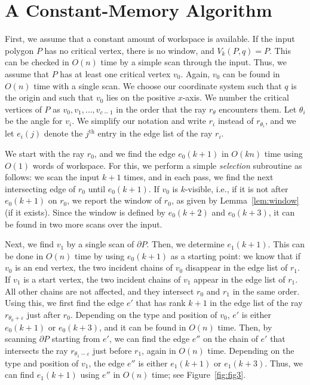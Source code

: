 \documentclass[11pt, a4paper]{article}
\newcommand{\eps}{\varepsilon}
\begin{document}
\section{A Constant-Memory Algorithm}\label{sec:constant-memory algorithm}

First, we assume that a constant amount of workspace is 
available. 
If the input polygon $P$ has no critical vertex, there 
is no window, and $V_k(P,q) = P$. This can be checked
in $O(n)$ time by a simple scan through the input.
Thus, we assume that 
$P$ has at least one critical vertex $v_0$. 
Again, $v_0$ can be found in $O(n)$ time with a single scan.
We choose our coordinate system such that
$q$ is the origin and such that $v_0$ lies on the positive $x$-axis.
We number the critical vertices of $P$ as $v_0, v_1,
\dots, v_{c-1}$ in the order that the ray $r_\theta$
encounters them. Let $\theta_i$ be the angle for $v_i$.
We simplify our notation and write $r_i$ instead
of $r_{\theta_i}$, and we let $e_{i}(j)$ denote the 
$j^\text{th}$ entry in the edge list of the ray $r_{i}$. 

We start with the ray $r_{0}$, and we find 
the edge $e_0(k+1)$ in $O(kn)$ time using $O(1)$ words of workspace. 
For this, we perform a simple \emph{selection} subroutine as follows:
we scan the input $k+1$ times, and in each pass, we find
the next intersecting edge of $r_{0}$ until 
$e_0(k+1)$. If $v_0$ is $k$-visible, i.e., if it is not after  
$e_0(k+1)$ on $r_{0}$, we report the window of 
$r_{0}$, as given by Lemma~\ref{lem:window} (if it exists). 
Since the window is defined by $e_0(k+2)$ and $e_0(k+3)$, 
it can be found in two more scans over the input.

Next, we find $v_1$ by a single scan of $\partial P$.
Then, we determine $e_1(k+1)$. 
This can be done in $O(n)$ time 
by using $e_0(k+1)$ as a starting point: we know that 
if $v_{0}$ is an end
vertex, the two incident chains of $v_0$ disappear
in the edge list of $r_1$. If $v_1$ is a start
vertex, the two incident chains of $v_1$ appear 
in the edge list of $r_1$.
All other chains are not affected, and they intersect $r_0$ and 
$r_1$ in the same order. 
Using this, we first find the edge $e'$ that has
rank $k+1$ in the edge list of the ray $r_{\theta_0 + \eps}$ just after
$r_0$. Depending on the type and position of $v_0$,
$e'$ is either $e_0(k+1)$ or $e_0(k+3)$, and it can
be found in $O(n)$ time. Then,
by scanning $\partial P$ starting from $e'$, we can
find the edge $e''$ on the chain of $e'$ that intersects
the ray $r_{\theta_1 - \eps}$ just before $r_1$, again
in $O(n)$ time. Depending on the type and position of $v_1$, 
the edge $e''$ is either $e_1(k+1)$ or $e_1(k+3)$. 
Thus, we can find $e_1(k+1)$ using $e''$ in $O(n)$ time; 
see Figure~\ref{fig:fig3}.
\end{document}
